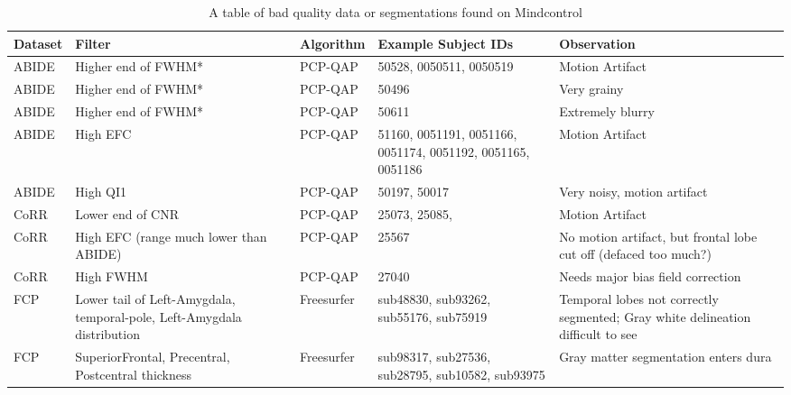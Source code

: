 \begin{table}
\begin{tabular}{ | l | p{3cm} | l | p{3cm} | p{4cm} | }

\hline
	\textbf{Dataset} & \textbf{Filter} & \textbf{Algorithm} & \textbf{Example Subject IDs} & \textbf{Observation} \\ \hline
	ABIDE & Higher end of FWHM* & PCP-QAP & 50528, 0050511, 0050519 & Motion Artifact \\ \hline
	ABIDE & Higher end of FWHM* & PCP-QAP & 50496 & Very grainy \\ \hline
	ABIDE & Higher end of FWHM* & PCP-QAP & 50611 & Extremely blurry \\ \hline
	ABIDE & High EFC & PCP-QAP & 51160, 0051191, 0051166, 0051174, 0051192, 0051165, 0051186 & Motion Artifact \\ \hline
	ABIDE & High QI1 & PCP-QAP & 50197, 50017 & Very noisy, motion artifact \\ \hline
	CoRR & Lower end of CNR & PCP-QAP & 25073, 25085, & Motion Artifact \\ \hline
	CoRR & High EFC (range much lower than ABIDE) & PCP-QAP & 25567 & No motion artifact, but frontal lobe cut off (defaced too much?) \\ \hline
	CoRR & High FWHM & PCP-QAP & 27040 & Needs major bias field correction \\ \hline
	FCP & Lower tail of Left-Amygdala, temporal-pole, Left-Amygdala distribution & Freesurfer & sub48830, sub93262, sub55176, sub75919 & Temporal lobes not correctly segmented; Gray white delineation difficult to see \\ \hline
	FCP & SuperiorFrontal, Precentral, Postcentral thickness & Freesurfer & sub98317, sub27536, sub28795, sub10582, sub93975 & Gray matter segmentation enters dura \\ \hline



\end{tabular}
\label{tab:examples}
\caption{A table of bad quality data or segmentations found on Mindcontrol}

\end{table}
